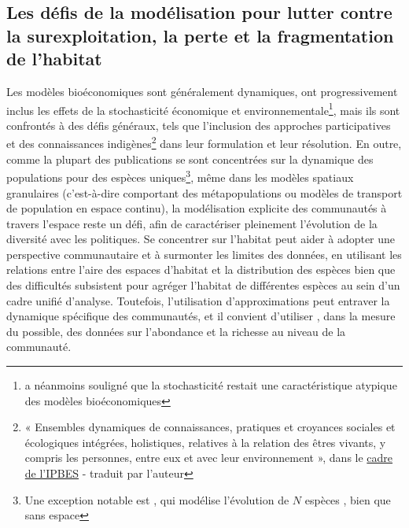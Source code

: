 \clearpage
{}
{}
\subsection*{Les défis de la modélisation pour lutter contre la surexploitation, la perte et la fragmentation de l'habitat}

Les modèles bioéconomiques sont généralement dynamiques, ont progressivement inclus les effets de la stochasticité économique et environnementale\footnote{\cite{Drechsler20200} a néanmoins souligné que la stochasticité restait une caractéristique atypique des modèles bioéconomiques }, mais ils sont confrontés à des défis généraux, tels que l'inclusion des approches participatives et des connaissances indigènes\footnote{« Ensembles dynamiques de connaissances, pratiques et croyances sociales et écologiques intégrées, holistiques, relatives à la relation des êtres vivants, y compris les personnes, entre eux et avec leur environnement », dans le \href{https://www. ipbes.net/glossary-tag/indigenous-and-local-knowledge}{cadre de l'IPBES} - traduit par l'auteur} dans leur formulation et leur résolution. En outre, comme la plupart des publications se sont concentrées sur la dynamique des populations pour des espèces uniques\footnote{Une exception notable est \cite{brock_optimal_2002}, qui modélise l'évolution de $N$ espèces , bien que sans espace},   même dans les modèles spatiaux granulaires \citep{sanchirico_bioeconomics_1999, SANCHIRICO200523, costello_optimal_2008,brock_pattern_2010, Sanchirico2010, albers_invasive_2010, costello_private_2017} (c'est-à-dire comportant des métapopulations ou modèles de transport de population en espace continu), la modélisation explicite des communautés à travers l'espace reste un défi, afin de caractériser pleinement l'évolution de la diversité avec les politiques. Se concentrer sur l'habitat peut aider à adopter une perspective communautaire et à surmonter les limites des données, en utilisant les relations entre l'aire des espaces d'habitat et la distribution des espèces \citep{macarthur_theory_1967} bien que des difficultés subsistent pour agréger l'habitat de différentes espèces au sein d'un cadre unifié d'analyse. Toutefois, l'utilisation d'approximations peut entraver la dynamique spécifique des communautés, et il convient d'utiliser , dans la mesure du possible, des données sur l'abondance et la richesse au niveau de la communauté. 

